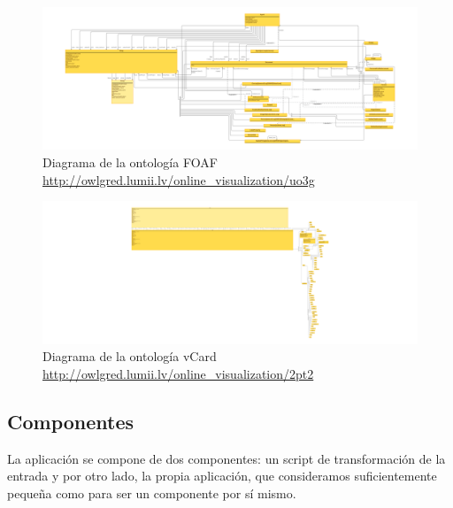 \documentclass[12pt]{report} %
\begin{document}
\begin{figure}
    \centering
    \includegraphics[width=\textwidth]{foaf.png}
    \caption{Diagrama de la ontología FOAF \\ \url{http://owlgred.lumii.lv/online_visualization/uo3g}}
    \label{fig:foaf}
\end{figure}

\begin{figure}
    \centering
    \includegraphics[width=\textwidth]{vcard.png}
    \caption{Diagrama de la ontología vCard \\ \url{http://owlgred.lumii.lv/online_visualization/2pt2}}
    \label{fig:vcard}
\end{figure}

\subsection{Componentes}

La aplicación se compone de dos componentes: un script de transformación de la entrada y por otro lado, la propia aplicación, que consideramos suficientemente pequeña como para ser un componente por sí mismo.
\end{document}
